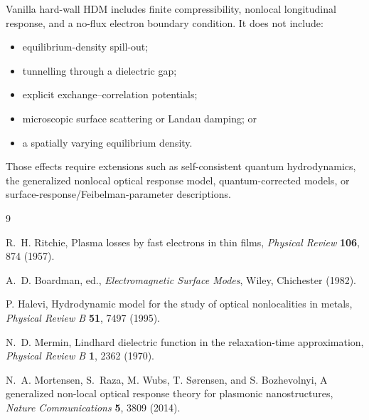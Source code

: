 \documentclass[11pt,a4paper]{article}
\begin{document}
Vanilla hard-wall HDM includes finite compressibility, nonlocal longitudinal
response, and a no-flux electron boundary condition.  It does not include:
\begin{itemize}
    \item equilibrium-density spill-out;
    \item tunnelling through a dielectric gap;
    \item explicit exchange--correlation potentials;
    \item microscopic surface scattering or Landau damping; or
    \item a spatially varying equilibrium density.
\end{itemize}
Those effects require extensions such as self-consistent quantum hydrodynamics,
the generalized nonlocal optical response model, quantum-corrected models, or
surface-response/Feibelman-parameter descriptions.

\begin{thebibliography}{9}

R.~H. Ritchie,
\newblock Plasma losses by fast electrons in thin films,
\newblock \emph{Physical Review} \textbf{106}, 874 (1957).

A.~D. Boardman, ed.,
\newblock \emph{Electromagnetic Surface Modes},
\newblock Wiley, Chichester (1982).

P. Halevi,
\newblock Hydrodynamic model for the study of optical nonlocalities in metals,
\newblock \emph{Physical Review B} \textbf{51}, 7497 (1995).

N.~D. Mermin,
\newblock Lindhard dielectric function in the relaxation-time approximation,
\newblock \emph{Physical Review B} \textbf{1}, 2362 (1970).

N.~A. Mortensen, S.~Raza, M. Wubs, T. S\o rensen, and S. Bozhevolnyi,
\newblock A generalized non-local optical response theory for plasmonic nanostructures,
\newblock \emph{Nature Communications} \textbf{5}, 3809 (2014).

\end{thebibliography}
\end{document}
